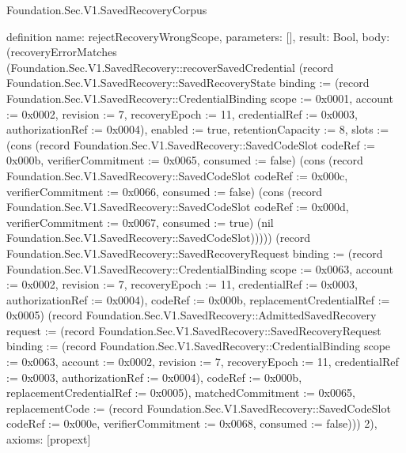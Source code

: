 \begin{lexlean}{Foundation.Sec.V1.SavedRecoveryCorpus}
\begin{semanticmodule}
definition{
  name: rejectRecoveryWrongScope,
  parameters: [],
  result: Bool,
  body: (recoveryErrorMatches (Foundation.Sec.V1.SavedRecovery::recoverSavedCredential (record Foundation.Sec.V1.SavedRecovery::SavedRecoveryState {binding := (record Foundation.Sec.V1.SavedRecovery::CredentialBinding {scope := 0x0001, account := 0x0002, revision := 7, recoveryEpoch := 11, credentialRef := 0x0003, authorizationRef := 0x0004}), enabled := true, retentionCapacity := 8, slots := (cons (record Foundation.Sec.V1.SavedRecovery::SavedCodeSlot {codeRef := 0x000b, verifierCommitment := 0x0065, consumed := false}) (cons (record Foundation.Sec.V1.SavedRecovery::SavedCodeSlot {codeRef := 0x000c, verifierCommitment := 0x0066, consumed := false}) (cons (record Foundation.Sec.V1.SavedRecovery::SavedCodeSlot {codeRef := 0x000d, verifierCommitment := 0x0067, consumed := true}) (nil Foundation.Sec.V1.SavedRecovery::SavedCodeSlot))))}) (record Foundation.Sec.V1.SavedRecovery::SavedRecoveryRequest {binding := (record Foundation.Sec.V1.SavedRecovery::CredentialBinding {scope := 0x0063, account := 0x0002, revision := 7, recoveryEpoch := 11, credentialRef := 0x0003, authorizationRef := 0x0004}), codeRef := 0x000b, replacementCredentialRef := 0x0005}) (record Foundation.Sec.V1.SavedRecovery::AdmittedSavedRecovery {request := (record Foundation.Sec.V1.SavedRecovery::SavedRecoveryRequest {binding := (record Foundation.Sec.V1.SavedRecovery::CredentialBinding {scope := 0x0063, account := 0x0002, revision := 7, recoveryEpoch := 11, credentialRef := 0x0003, authorizationRef := 0x0004}), codeRef := 0x000b, replacementCredentialRef := 0x0005}), matchedCommitment := 0x0065, replacementCode := (record Foundation.Sec.V1.SavedRecovery::SavedCodeSlot {codeRef := 0x000e, verifierCommitment := 0x0068, consumed := false})})) 2),
  axioms: [propext]
}


\end{semanticmodule}
\end{lexlean}
